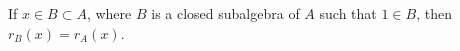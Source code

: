 If $x \in B \subset A$, where $B$ is a closed subalgebra of $A$ such that $1 \in B$, then $r_B(x) = r_A(x)$.

